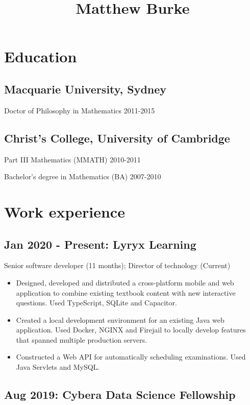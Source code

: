 \documentclass[11pt]{article}
\date{}
\date{}
\title{Matthew Burke}
\begin{document}
\maketitle

\section*{Education}

\subsection*{Macquarie University, Sydney}

Doctor of Philosophy in Mathematics 2011-2015

\subsection*{Christ's College, University of Cambridge}

Part III Mathematics (MMATH) 2010-2011

Bachelor's degree in Mathematics (BA) 2007-2010 

\section*{Work experience}

\subsection*{Jan 2020 - Present: Lyryx Learning}

Senior software developer (11 months); Director of technology (Current)

\begin{itemize}
\item Designed, developed and distributed a cross-platform mobile and web application to combine existing textbook content with new interactive questions. Used TypeScript, SQLite and Capacitor.
\item Created a local development environment for an existing Java web application. Used Docker, NGINX and Firejail to locally develop features that spanned multiple production servers.
\item Constructed a Web API for automatically scheduling examinations. Used Java Servlets and MySQL.
\end{itemize}

\subsection*{Aug 2019: Cybera Data Science Fellowship}
\end{document}
